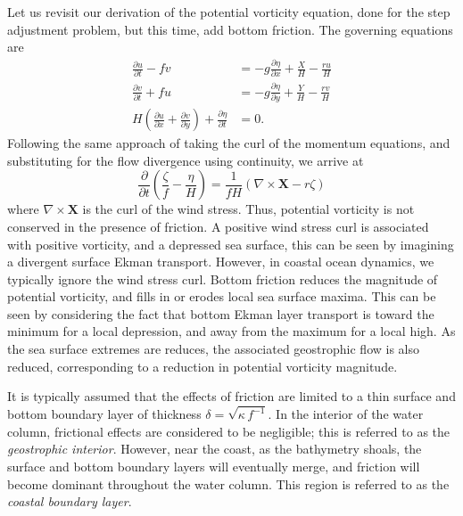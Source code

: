 \documentclass[11pt]{report}
\numberwithin{equation}{section}
\begin{document}
Let us revisit our derivation of the potential vorticity equation, done for the step adjustment problem, but this time, add bottom friction.  The governing equations are
\begin{align}
    \frac{\partial u}{\partial t} - f v
                &= -g\frac{\partial \eta}{\partial x} 
                    + \frac{X}{H} - \frac{r u}{H} \label{eq:u-shallow-linear-drag} \\
    \frac{\partial v}{\partial t} + f u
                &= -g\frac{\partial \eta}{\partial y} 
                    + \frac{Y}{H} - \frac{r v}{H} \label{eq:v-shallow-linear-drag} \\
    H\left(\frac{\partial u}{\partial x} + \frac{\partial v}{\partial y}\right)
        + \frac{\partial \eta}{\partial t} 
                &= 0. \label{eq:cont-shallow-linear-drag}
\end{align}
Following the same approach of taking the curl of the momentum equations, and substituting for the flow divergence using continuity, we arrive at
\begin{equation}
    \frac{\partial}{\partial t} \left( \frac{\zeta}{f} - \frac{\eta}{H} \right) = 
        \frac{1}{f H} \left( \nabla\times\mathbf{X} - r \zeta \right)
\end{equation}
where $\nabla\times\mathbf{X}$ is the curl of the wind stress.  Thus, potential vorticity is not conserved in the presence of friction.  A positive wind stress curl is associated with positive vorticity, and a depressed sea surface, this can be seen by imagining a divergent surface Ekman transport.  However, in coastal ocean dynamics, we typically ignore the wind stress curl.  Bottom friction reduces the magnitude of potential vorticity, and fills in or erodes local sea surface maxima.  This can be seen by considering the fact that bottom Ekman layer transport is toward the minimum for a local depression, and away from the maximum for a local high.  As the sea surface extremes are reduces, the associated geostrophic flow is also reduced, corresponding to a reduction in potential vorticity magnitude.

It is typically assumed that the effects of friction are limited to a thin surface and bottom boundary layer of thickness $\delta = \sqrt{\kappa\,f^{-1}}$.  In the interior of the water column, frictional effects are considered to be negligible; this is referred to as the {\it geostrophic interior}.  However, near the coast, as the bathymetry shoals, the surface and bottom boundary layers will eventually merge, and friction will become dominant throughout the water column.  This region is referred to as the {\it coastal boundary layer}.
\end{document}
